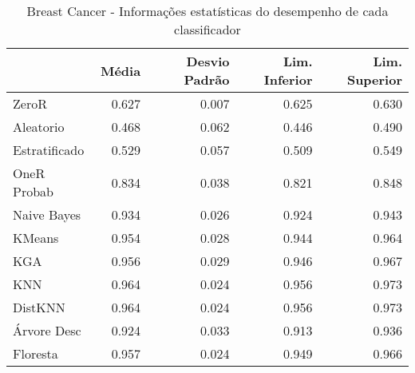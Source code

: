 \begin{table}
\centering
\label{Breast_Cancer_status_table}
\begin{tabular}{lrrrr}
\toprule
{} & Média & Desvio Padrão & Lim. Inferior & Lim. Superior \\
\midrule
ZeroR         & 0.627 &         0.007 &         0.625 &         0.630 \\
Aleatorio     & 0.468 &         0.062 &         0.446 &         0.490 \\
Estratificado & 0.529 &         0.057 &         0.509 &         0.549 \\
OneR Probab   & 0.834 &         0.038 &         0.821 &         0.848 \\
Naive Bayes   & 0.934 &         0.026 &         0.924 &         0.943 \\
KMeans        & 0.954 &         0.028 &         0.944 &         0.964 \\
KGA           & 0.956 &         0.029 &         0.946 &         0.967 \\
KNN           & 0.964 &         0.024 &         0.956 &         0.973 \\
DistKNN       & 0.964 &         0.024 &         0.956 &         0.973 \\
Árvore Desc   & 0.924 &         0.033 &         0.913 &         0.936 \\
Floresta      & 0.957 &         0.024 &         0.949 &         0.966 \\
\bottomrule
\end{tabular}
\caption{Breast Cancer - Informações estatísticas do desempenho de cada classificador}
\end{table}
